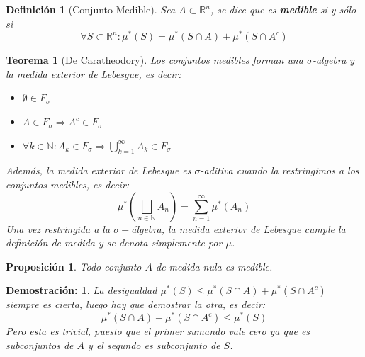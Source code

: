 \documentclass[10pt,a4paper,openright]{book}
\theoremstyle{break}
\newtheorem*{defi}{Definición}
\newtheorem*{theo}{Teorema}
\newtheorem*{prop}{Proposición}
\newtheorem*{demo}{\underline{Demostración}:}
\begin{document}
\begin{defi}[Conjunto Medible]
Sea $A \subset \mathbb{R}^n$, se dice que es \textbf{medible} si y sólo si
$$\forall S \subset \mathbb{R}^n : \mu^*\left( S \right) = \mu^*\left( S\cap A \right) + \mu^*\left( S \cap A^c \right)$$
\end{defi}

\begin{theo}[De Caratheodory]
Los conjuntos medibles forman una $\sigma$-algebra y la medida exterior de Lebesgue, es decir:
\begin{itemize}
\item $\emptyset \in F_\sigma$
\item $A\in F_ \sigma \Rightarrow A^c \in F_\sigma$
\item $\forall k \in \mathbb{N}: A_k \in F_\sigma \Rightarrow \bigcup_{k=1}^\infty A_k \in F_\sigma$
\end{itemize}
Además, la medida exterior de Lebesque es $ \sigma$-aditiva cuando la restringimos a los conjuntos medibles, es decir:
$$\mu^*\left(\bigsqcup_{n\in \mathbb{N}}A_n\right) = \sum_{n=1}^\infty \mu^*(A_n)$$
Una vez restringida a la $\sigma-$álgebra, la medida exterior de Lebesque cumple la definición de medida y se denota simplemente por $\mu$.
\end{theo}

\begin{prop}
Todo conjunto $A$ de medida nula es medible.
\end{prop}
\begin{demo}
La desigualdad $\mu^*\left( S \right) \le \mu^*\left( S\cap A \right) + \mu^*\left( S\cap A^c \right)$ siempre es cierta, luego hay que demostrar la otra, es decir:
$$ \mu^*\left( S\cap A \right) + \mu^*\left( S\cap A^c \right) \le \mu^*\left( S \right) $$
Pero esta es trivial, puesto que el primer sumando vale cero ya que es subconjuntos de $A$ y el segundo es subconjunto de $S$.
\end{demo}
\end{document}
